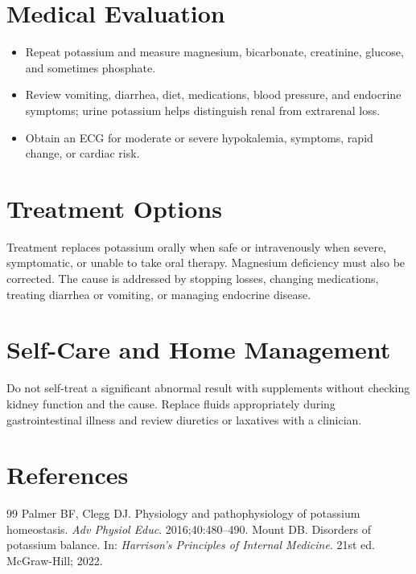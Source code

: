 \section*{Medical Evaluation}
\begin{itemize}
  \item Repeat potassium and measure magnesium, bicarbonate, creatinine, glucose, and sometimes phosphate.
  \item Review vomiting, diarrhea, diet, medications, blood pressure, and endocrine symptoms; urine potassium helps distinguish renal from extrarenal loss.
  \item Obtain an ECG for moderate or severe hypokalemia, symptoms, rapid change, or cardiac risk.
\end{itemize}

\section*{Treatment Options}
Treatment replaces potassium orally when safe or intravenously when severe, symptomatic, or unable to take oral therapy. Magnesium deficiency must also be corrected. The cause is addressed by stopping losses, changing medications, treating diarrhea or vomiting, or managing endocrine disease.

\section*{Self-Care and Home Management}
Do not self-treat a significant abnormal result with supplements without checking kidney function and the cause. Replace fluids appropriately during gastrointestinal illness and review diuretics or laxatives with a clinician.

\section*{References}
\begin{thebibliography}{99}
 Palmer BF, Clegg DJ. Physiology and pathophysiology of potassium homeostasis. \textit{Adv Physiol Educ}. 2016;40:480--490.
 Mount DB. Disorders of potassium balance. In: \textit{Harrison's Principles of Internal Medicine}. 21st ed. McGraw-Hill; 2022.
\end{thebibliography}
